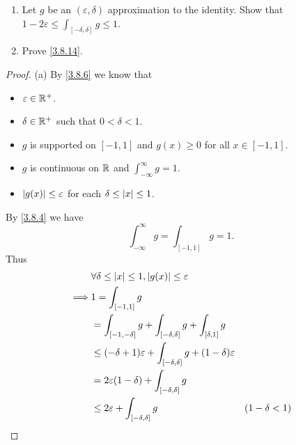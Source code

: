 \begin{ex}\label{ex:3.8.6}
  \quad
  \begin{enumerate}
    \item Let \(g\) be an \((\varepsilon, \delta)\) approximation to the identity.
          Show that \(1 - 2 \varepsilon \leq \int_{[-\delta, \delta]} g \leq 1\).
    \item Prove \cref{3.8.14}.
  \end{enumerate}
\end{ex}

\begin{proof}{(a)}
  By \cref{3.8.6} we know that
  \begin{itemize}
    \item \(\varepsilon \in \mathbb{R}^+\).
    \item \(\delta \in \mathbb{R}^+\) such that \(0 < \delta < 1\).
    \item \(g\) is supported on \([-1, 1]\) and \(g(x) \geq 0\) for all \(x \in [-1, 1]\).
    \item \(g\) is continuous on \(\mathbb{R}\) and \(\int_{-\infty}^\infty g = 1\).
    \item \(\left\lvert g(x)\right\rvert \leq \varepsilon\) for each \(\delta \leq \left\lvert x\right\rvert \leq 1\).
  \end{itemize}
  By \cref{3.8.4} we have
  \[
    \int_{-\infty}^\infty g = \int_{[-1, 1]} g = 1.
  \]
  Thus
  \begin{align*}
             & \forall \delta \leq \abs{x} \leq 1, \abs{g(x)} \leq \varepsilon                                                                                \\
    \implies & 1 = \int_{[-1, 1]} g                                                                                                                           \\
             & = \int_{[-1, -\delta]} g + \int_{[-\delta, \delta]} g + \int_{[\delta, 1]} g                                                                   \\
             & \leq (-\delta + 1) \varepsilon + \int_{[-\delta, \delta]} g + (1 - \delta) \varepsilon                                                         \\
             & = 2 \varepsilon (1 - \delta) + \int_{[-\delta, \delta]} g                                                                                      \\
             & \leq 2 \varepsilon + \int_{[-\delta, \delta]} g                                                 & (1 - \delta < 1)                             \\

\end{align*}
\end{proof}

